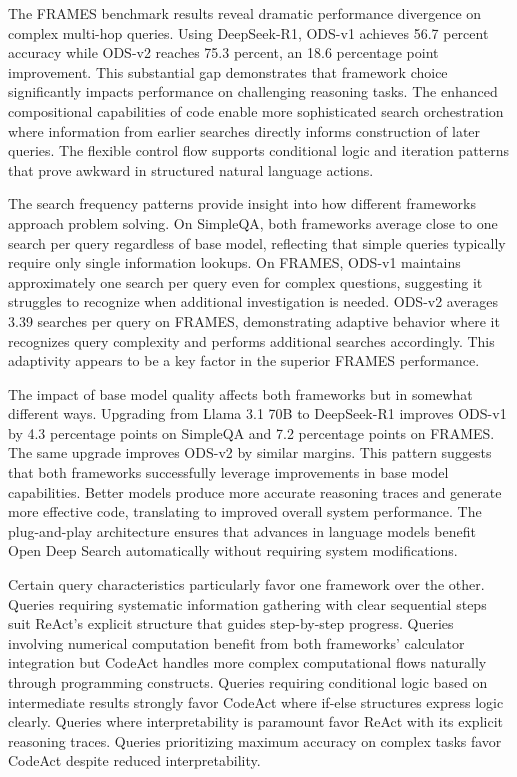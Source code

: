 The FRAMES benchmark results reveal dramatic performance divergence on complex multi-hop queries. Using DeepSeek-R1, ODS-v1 achieves 56.7 percent accuracy while ODS-v2 reaches 75.3 percent, an 18.6 percentage point improvement. This substantial gap demonstrates that framework choice significantly impacts performance on challenging reasoning tasks. The enhanced compositional capabilities of code enable more sophisticated search orchestration where information from earlier searches directly informs construction of later queries. The flexible control flow supports conditional logic and iteration patterns that prove awkward in structured natural language actions.

The search frequency patterns provide insight into how different frameworks approach problem solving. On SimpleQA, both frameworks average close to one search per query regardless of base model, reflecting that simple queries typically require only single information lookups. On FRAMES, ODS-v1 maintains approximately one search per query even for complex questions, suggesting it struggles to recognize when additional investigation is needed. ODS-v2 averages 3.39 searches per query on FRAMES, demonstrating adaptive behavior where it recognizes query complexity and performs additional searches accordingly. This adaptivity appears to be a key factor in the superior FRAMES performance.

The impact of base model quality affects both frameworks but in somewhat different ways. Upgrading from Llama 3.1 70B to DeepSeek-R1 improves ODS-v1 by 4.3 percentage points on SimpleQA and 7.2 percentage points on FRAMES. The same upgrade improves ODS-v2 by similar margins. This pattern suggests that both frameworks successfully leverage improvements in base model capabilities. Better models produce more accurate reasoning traces and generate more effective code, translating to improved overall system performance. The plug-and-play architecture ensures that advances in language models benefit Open Deep Search automatically without requiring system modifications.

Certain query characteristics particularly favor one framework over the other. Queries requiring systematic information gathering with clear sequential steps suit ReAct's explicit structure that guides step-by-step progress. Queries involving numerical computation benefit from both frameworks' calculator integration but CodeAct handles more complex computational flows naturally through programming constructs. Queries requiring conditional logic based on intermediate results strongly favor CodeAct where if-else structures express logic clearly. Queries where interpretability is paramount favor ReAct with its explicit reasoning traces. Queries prioritizing maximum accuracy on complex tasks favor CodeAct despite reduced interpretability.

